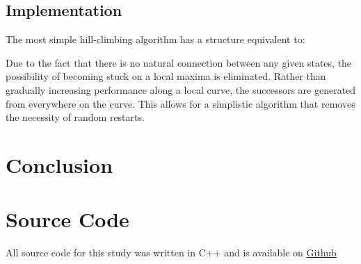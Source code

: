 \documentclass[12pt]{article}
\begin{document}
\subsection {Implementation}

The most simple hill-climbing algorithm has a structure equivalent to: \\

\begin{algorithm}[H]
\end{algorithm}

\pagebreak

Due to the fact that there is no natural connection between any given states,
the possibility of becoming stuck on a local maxima is eliminated. Rather than
gradually increasing performance along a local curve, the successors are
generated from everywhere on the curve. This allows for a simplistic algorithm
that removes the necessity of random restarts.

\section{Conclusion}

\pagebreak

\section{Source Code}
All source code for this study was written in C++ and is
available on
\href{https://github.com/Quinny/IteratedPrisoners}{Github}
\end{document}
